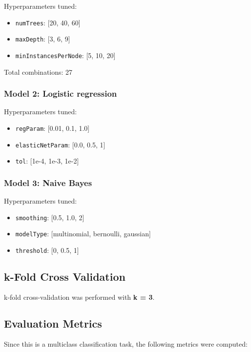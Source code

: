 \documentclass[12pt,a4paper]{article}
\begin{document}
Hyperparameters tuned:

\begin{itemize}
    \item \texttt{numTrees}: [20, 40, 60]
    \item \texttt{maxDepth}: [3, 6, 9]
    \item \texttt{minInstancesPerNode}: [5, 10, 20]
\end{itemize}

Total combinations: 27

\subsubsection{Model 2: Logistic regression}

Hyperparameters tuned:

\begin{itemize}
    \item \texttt{regParam}: [0.01, 0.1, 1.0]
    \item \texttt{elasticNetParam}: [0.0, 0.5, 1]
    \item \texttt{tol}: [1e-4, 1e-3, 1e-2]
\end{itemize}

\subsubsection{Model 3: Naive Bayes}

Hyperparameters tuned:

\begin{itemize}
    \item \texttt{smoothing}: [0.5, 1.0, 2]
    \item \texttt{modelType}: [multinomial, bernoulli, gaussian]
    \item \texttt{threshold}: [0, 0.5, 1]
\end{itemize}

\subsection{k-Fold Cross Validation}

k-fold cross-validation was performed with \textbf{k = 3}.

\subsection{Evaluation Metrics}

Since this is a multiclass classification task, the following metrics were computed:
\end{document}

